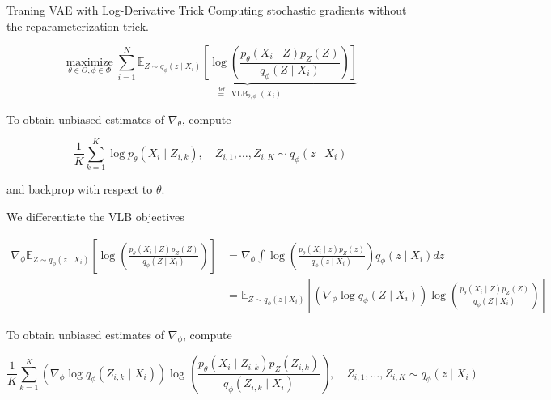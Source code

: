 \begin{frame}[allowframebreaks]

\begin{myconceptblock}{11.22}{Traning VAE with Log-Derivative Trick}
    Computing stochastic gradients without the reparameterization trick.

    $$
    \underset{\theta \in \Theta, \phi \in \Phi}{\operatorname{maximize}} \sum_{i=1}^{N} \underbrace{\mathbb{E}_{Z \sim q_{\phi}\left(z \mid X_{i}\right)}\left[\log \left(\frac{p_{\theta}\left(X_{i} \mid Z\right) p_{Z}(Z)}{q_{\phi}\left(Z \mid X_{i}\right)}\right)\right]}_{\stackrel{\text { def }}{=} \operatorname{VLB}_{\theta, \phi}\left(X_{i}\right)}
    $$

    To obtain unbiased estimates of $\nabla_{\theta}$, compute

    $$
    \frac{1}{K} \sum_{k=1}^{K} \log p_{\theta}\left(X_{i} \mid Z_{i, k}\right), \quad Z_{i, 1}, \ldots, Z_{i, K} \sim q_{\phi}\left(z \mid X_{i}\right)
    $$

    and backprop with respect to $\theta$.

    We differentiate the VLB objectives

    $$
    \begin{aligned}
    \nabla_{\phi} \mathbb{E}_{Z \sim q_{\phi}\left(z \mid X_{i}\right)}\left[\log \left(\frac{p_{\theta}\left(X_{i} \mid Z\right) p_{Z}(Z)}{q_{\phi}\left(Z \mid X_{i}\right)}\right)\right] & =\nabla_{\phi} \int \log \left(\frac{p_{\theta}\left(X_{i} \mid z\right) p_{Z}(z)}{q_{\phi}\left(z \mid X_{i}\right)}\right) q_{\phi}\left(z \mid X_{i}\right) d z \\
    & =\mathbb{E}_{Z \sim q_{\phi}\left(z \mid X_{i}\right)}\left[\left(\nabla_{\phi} \log q_{\phi}\left(Z \mid X_{i}\right)\right) \log \left(\frac{p_{\theta}\left(X_{i} \mid Z\right) p_{Z}(Z)}{q_{\phi}\left(Z \mid X_{i}\right)}\right)\right]
    \end{aligned}
    $$

    To obtain unbiased estimates of $\nabla_{\phi}$, compute

    $$
    \frac{1}{K} \sum_{k=1}^{K}\left(\nabla_{\phi} \log q_{\phi}\left(Z_{i, k} \mid X_{i}\right)\right) \log \left(\frac{p_{\theta}\left(X_{i} \mid Z_{i, k}\right) p_{Z}\left(Z_{i, k}\right)}{q_{\phi}\left(Z_{i, k} \mid X_{i}\right)}\right), \quad Z_{i, 1}, \ldots, Z_{i, K} \sim q_{\phi}\left(z \mid X_{i}\right)
    $$
\end{myconceptblock}

\end{frame}

